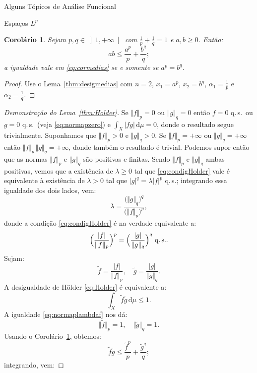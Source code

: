 \documentclass[oneside,final,11pt]{amsbook}
\newcommand{\dd}{\mathrm d}
\newcommand{\qs}{\hbox{q.$\,$s.}}
\theoremstyle{remark}\newtheorem{exercise}{Exercício}[chapter]
\theoremstyle{remark}\newtheorem{*exercise}[exercise]{\hbox to 0pt{\hskip 0pt minus 1fil*}Exercício}
\theoremstyle{definition}\newtheorem{exdefin}{Definição}[chapter]
\theoremstyle{plain}\newtheorem{teo}{Teorema}[section]
\theoremstyle{plain}\newtheorem{lem}[teo]{Lema}
\theoremstyle{plain}\newtheorem{prop}[teo]{Proposição}
\theoremstyle{plain}\newtheorem{cor}[teo]{Corolário}
\theoremstyle{definition}\newtheorem{defin}[teo]{Definição}
\theoremstyle{remark}\newtheorem{rem}[teo]{Observação}
\theoremstyle{definition}\newtheorem{notation}[teo]{Notação}
\theoremstyle{definition}\newtheorem{convention}[teo]{Convenção}
\theoremstyle{definition}\newtheorem{example}[teo]{Exemplo}
\numberwithin{section}{chapter}
\numberwithin{equation}{section}
\begin{document}
\begin{chapter}{Alguns Tópicos de Análise Funcional}
\begin{section}[Espaços $L^p$]{Espaços ${L^p}$}
\begin{cor}\label{thm:cormedias}
Sejam $p,q\in\left]1,+\infty\right[$ com $\frac1p+\frac1q=1$ e $a,b\ge0$. Então:
\begin{equation}\label{eq:cormedias}
ab\le\frac{a^p}p+\frac{b^q}q;
\end{equation}
a igualdade vale em \eqref{eq:cormedias} se e somente se $a^p=b^q$.
\end{cor}
\begin{proof}
Use o Lema~\ref{thm:desigmedias} com $n=2$, $x_1=a^p$, $x_2=b^q$, $\alpha_1=\frac1p$ e $\alpha_2=\frac1q$.
\end{proof}

\begin{proof}[Demonstração do Lema~\ref{thm:Holder}]
Se $\Vert f\Vert_p=0$ ou $\Vert g\Vert_q=0$ então $f=0$ \qs\ ou $g=0$ \qs\ (veja \eqref{eq:normapzero}) e
$\int_X\vert fg\vert\,\dd\mu=0$, donde o resultado segue trivialmente.
Suponhamos que $\Vert f\Vert_p>0$ e $\Vert g\Vert_q>0$. Se $\Vert f\Vert_p=+\infty$
ou $\Vert g\Vert_q=+\infty$ então $\Vert f\Vert_p\,\Vert g\Vert_q=+\infty$, donde também o resultado é trivial.
Podemos supor então que as normas $\Vert f\Vert_p$ e $\Vert g\Vert_q$ são positivas e finitas. Sendo $\Vert f\Vert_p$ e $\Vert g\Vert_q$
ambas positivas, vemos que a existência de $\lambda\ge0$ tal que \eqref{eq:condigHolder} vale é equivalente à existência de
$\lambda>0$ tal que $\vert g\vert^q=\lambda\vert f\vert^p$ \qs; integrando essa igualdade dos dois lados, vem:
\[\lambda=\frac{\big(\Vert g\Vert_q\big)^q}{\big(\Vert f\Vert_p\big)^p},\]
donde a condição \eqref{eq:condigHolder} é na verdade equivalente a:
\begin{equation}\label{eq:condigHolderequiv}
\Big(\frac{\vert f\vert}{\Vert f\Vert_p}\Big)^p=\Big(\frac{\vert g\vert}{\Vert g\Vert_q}\Big)^q\ \qs.
\end{equation}
Sejam:
\[\tilde f=\frac{\vert f\vert}{\Vert f\Vert_p},\quad\tilde g=\frac{\vert g\vert}{\Vert g\Vert_q}.\]
A desigualdade de Hölder \eqref{eq:Holder} é equivalente a:
\begin{equation}\label{eq:Holder1}
\int_X\tilde f\tilde g\,\dd\mu\le1.
\end{equation}
A igualdade \eqref{eq:normaplambdaf} nos dá:
\[\Vert\tilde f\Vert_p=1,\quad\Vert\tilde g\Vert_q=1.\]
Usando o Corolário~\ref{thm:cormedias}, obtemos:
\begin{equation}\label{eq:tildeftildegpq}
\tilde f\tilde g\le\frac{\tilde f^p}p+\frac{\tilde g^q}q;
\end{equation}
integrando, vem:

\end{proof}
\end{section}
\end{chapter}
\end{document}

